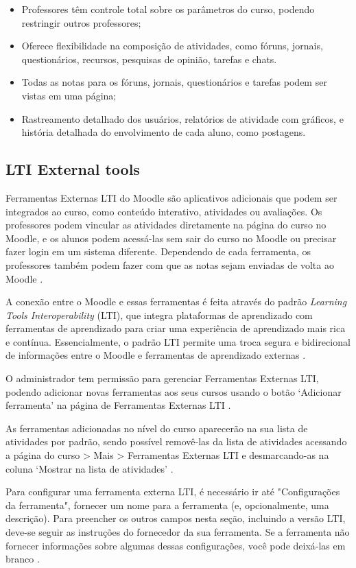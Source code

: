 \begin{itemize}
    \item Professores têm controle total sobre os parâmetros do curso, podendo restringir outros professores;
    \item Oferece flexibilidade na composição de atividades, como fóruns, jornais, questionários, recursos, pesquisas de opinião, tarefas e chats. 
    \item Todas as notas para os fóruns, jornais, questionários e tarefas podem ser vistas em uma página;
    \item Rastreamento detalhado dos usuários, relatórios de atividade com gráficos, e história detalhada do envolvimento de cada aluno, como postagens.
\end{itemize}

\subsection{LTI External tools}

Ferramentas Externas LTI do Moodle são aplicativos adicionais que podem ser integrados ao curso, como conteúdo interativo, atividades ou avaliações. Os professores podem vincular as atividades diretamente na página do curso no Moodle, e os alunos podem acessá-las sem sair do curso no Moodle ou precisar fazer login em um sistema diferente. Dependendo de cada ferramenta, os professores também podem fazer com que as notas sejam enviadas de volta ao Moodle \cite{moodle}.

A conexão entre o Moodle e essas ferramentas é feita através do padrão \textit{Learning Tools Interoperability} (LTI), que integra plataformas de aprendizado com ferramentas de aprendizado para criar uma experiência de aprendizado mais rica e contínua. Essencialmente, o padrão LTI permite uma troca segura e bidirecional de informações entre o Moodle e ferramentas de aprendizado externas \cite{moodle}. 

O administrador tem permissão para gerenciar Ferramentas Externas LTI, podendo adicionar novas ferramentas aos seus cursos usando o botão ‘Adicionar ferramenta’ na página de Ferramentas Externas LTI \cite{moodle}.

As ferramentas adicionadas no nível do curso aparecerão na sua lista de atividades por padrão, sendo possível removê-las da lista de atividades acessando a página do curso > Mais > Ferramentas Externas LTI e desmarcando-as na coluna ‘Mostrar na lista de atividades’ \cite{moodle}.

Para configurar uma ferramenta externa LTI, é necessário ir até "Configurações da ferramenta", fornecer um nome para a ferramenta (e, opcionalmente, uma descrição). Para preencher os outros campos nesta seção, incluindo a versão LTI, deve-se seguir as instruções do fornecedor da sua ferramenta. Se a ferramenta não fornecer informações sobre algumas dessas configurações, você pode deixá-las em branco \cite{moodle}.

